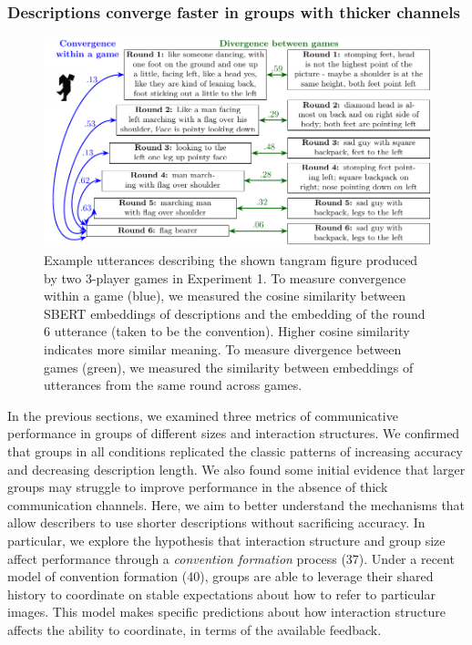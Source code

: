 \documentclass[9pt,twocolumn,twoside]{pnas-new}
\begin{document}
\subsubsection*{Descriptions converge faster in groups with thicker
channels}\label{descriptions-converge-faster-in-groups-with-thicker-channels}

\begin{figure}[t!]

{\centering \includegraphics[width=1\linewidth]{sbert.pdf} 

}

\caption{Example utterances describing the shown tangram figure produced by two 3-player games in Experiment 1. To measure convergence within a game (blue), we measured the cosine similarity between SBERT embeddings of descriptions and the embedding of the round 6 utterance (taken to be the convention). Higher cosine similarity indicates more similar meaning. To measure divergence between games (green), we measured the similarity between embeddings of utterances from the same round across games.}
\end{figure}

In the previous sections, we examined three metrics of communicative
performance in groups of different sizes and interaction structures. We
confirmed that groups in all conditions replicated the classic patterns
of increasing accuracy and decreasing description length. We also found
some initial evidence that larger groups may struggle to improve
performance in the absence of thick communication channels. Here, we aim
to better understand the mechanisms that allow describers to use shorter
descriptions without sacrificing accuracy. In particular, we explore the
hypothesis that interaction structure and group size affect performance
through a \emph{convention formation} process (37). Under a recent model
of convention formation (40), groups are able to leverage their shared
history to coordinate on stable expectations about how to refer to
particular images. This model makes specific predictions about how
interaction structure affects the ability to coordinate, in terms of the
available feedback.
\end{document}
